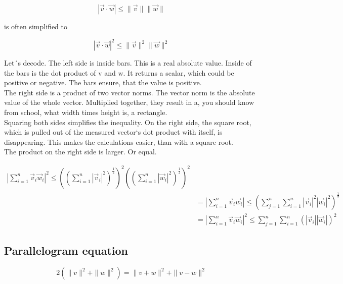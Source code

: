 \documentclass[a4paper]{article}
\begin{document}
\begin{Example}
\begin{displaymath}
    |\vec{v}\cdot\vec{w}| \leq \|\vec{v}\|\|\vec{w}\|
\end{displaymath}

is often simplified to

\begin{displaymath}
    |\vec{v}\cdot\vec{w}|^{2} \leq \|\vec{v}\|^{2}\|\vec{w}\|^{2}
\end{displaymath}

Let´s decode. The left side is inside bars. This is a real absolute value. Inside of the bars is the dot product of v and w. It returns a scalar, which could be positive or negative. The bars ensure, that the value is positive.\\

The right side is a product of two vector norms. The vector norm is the absolute value of the whole vector. Multiplied together, they result in a, you should know from school, what width times height is, a rectangle. \\

Squaring both sides simplifies the inequality. On the right side, the square root, which is pulled out of the measured vector`s dot product with itself, is disappearing. This makes the calculations easier, than with a square root.\\

The product on the right side is larger. Or equal. 

\begin{displaymath}
\begin{align}    
    |\sum_{i=1}^{n}\vec{v}_{i}\vec{w}_{i}|^{2} \leq ((\sum_{i=1}^{n}|\vec{v}_{i}|^{2})^{\frac{1}{2}})^{2}((\sum_{i=1}^{n}|\vec{w}_{i}|^{2})^{\frac{1}{2}})^{2}\\
    &= |\sum_{i=1}^{n}\vec{v}_{i}\vec{w}_{i}| \leq (\sum_{j=1}^{n}\sum_{i=1}^{n}|\vec{v}_{i}|^{2}|\vec{w}_{i}|^{2})^{\frac{1}{2}}\\
&=
|\sum_{i=1}^{n}\vec{v}_{i}\vec{w}_{i}|^{2} \leq \sum_{j=1}^{n}\sum_{i=1}^{n}(|\vec{v}_{i}||\vec{w}_{i}|)^{2}
\end{align}
\end{displaymath}

\subsection{Parallelogram equation}

\begin{displaymath}
2(\|v\|^{2} + \|w\|^{2}) = \|v+w\|^{2}+\|v-w\|^{2}
\end{displaymath}


\end{Example}
\end{document}
